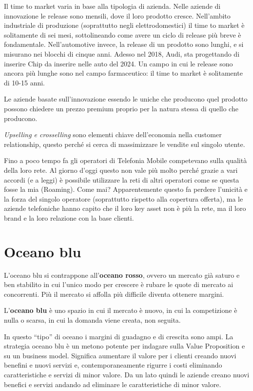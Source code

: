 Il time to market varia in base alla tipologia di azienda. Nelle aziende di
innovazione le release sono mensili, dove il loro prodotto cresce. Nell'ambito
industriale di produzione (soprattutto negli elettrodomestici) il time to
market è solitamente di sei mesi, sottolineando come avere un ciclo di release
più breve è fondamentale. Nell'automotive invece, la release di un prodotto
sono lunghi, e si misurano nei blocchi di cinque anni. Adesso nel 2018, Audi,
sta progettando di inserire Chip da inserire nelle auto del 2024. Un campo in
cui le release sono ancora più lunghe sono nel campo farmaceutico: il time to
market è solitamente di 10-15 anni.

Le aziende basate sull'innovazione essendo le uniche che producono quel
prodotto possono chiedere un prezzo premium proprio per la natura stessa di
quello che producono.

\textit{Upselling e crosselling} sono elementi chiave dell'economia nella
customer relationship, questo perché si cerca di massimizzare le vendite sul
singolo utente.

Fino a poco tempo fa gli operatori di Telefonia Mobile competevano sulla
qualità della loro rete. Al giorno d'oggi questo non vale più molto perché
grazie a vari accordi (e a leggi) è possibile utilizzare la reti di altri
operatori come se questa fosse la mia (Roaming). Come mai? Apparentemente
questo fa perdere l'unicità e la forza del singolo operatore (soprattutto
rispetto alla copertura offerta), ma le aziende telefoniche hanno capito che il
loro key asset non è più la rete, ma il loro brand e la loro relazione con la
base clienti.


\section{Oceano blu}

L'oceano blu si contrappone all'\textbf{oceano rosso}, ovvero un mercato già
saturo e ben stabilito in cui l'unico modo per crescere è rubare le quote di
mercato ai concorrenti. Più il mercato si affolla più difficile diventa
ottenere margini.

\begin{definition}
L'\textbf{oceano blu} è uno spazio in cui il mercato è nuovo, in cui la
competizione è nulla o scarsa, in cui la domanda viene creata, non seguita.
\end{definition}

\noindent In questo ``tipo'' di oceano i margini di guadagno e di crescita sono
ampi. La strategia oceano blu è un metono potente per indagare sulla Value
Proposition e su un business model. Significa aumentare il valore per i clienti
creando nuovi benefini e nuovi servizi e, contemporaneamente rigurre i costi
eliminando caratteristiche e servizi di minor valore.
Da un lato quindi le aziende creano nuovi benefici e servizi andando ad
eliminare le caratteristiche di minor valore.

